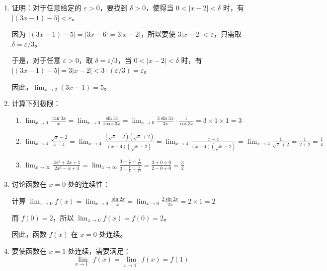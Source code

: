 \documentclass[oneside]{book}
\begin{document}
\begin{answer}
\begin{enumerate}
    \item 证明：对于任意给定的 $\varepsilon > 0$，要找到 $\delta > 0$，使得当 $0 < |x-2| < \delta$ 时，有 $|(3x-1)-5| < \varepsilon$。
    
    因为 $|(3x-1)-5| = |3x-6| = 3|x-2|$，所以要使 $3|x-2| < \varepsilon$，只需取 $\delta = \varepsilon/3$。
    
    于是，对于任意 $\varepsilon > 0$，取 $\delta = \varepsilon/3$，当 $0 < |x-2| < \delta$ 时，有 $|(3x-1)-5| = 3|x-2| < 3 \cdot (\varepsilon/3) = \varepsilon$。
    
    因此，$\displaystyle \lim_{x \to 2} (3x-1) = 5$。
    
    \item 计算下列极限：
    \begin{enumerate}
        \item $\displaystyle \lim_{x \to 0} \frac{\tan 3x}{x} = \lim_{x \to 0} \frac{\sin 3x}{x \cos 3x} = \lim_{x \to 0} \frac{3\sin 3x}{3x} \cdot \frac{1}{\cos 3x} = 3 \times 1 \times 1 = 3$
        
        \item $\displaystyle \lim_{x \to 4} \frac{\sqrt{x} - 2}{x - 4} = \lim_{x \to 4} \frac{(\sqrt{x} - 2)(\sqrt{x} + 2)}{(x-4)(\sqrt{x} + 2)} = \lim_{x \to 4} \frac{x-4}{(x-4)(\sqrt{x} + 2)} = \lim_{x \to 4} \frac{1}{\sqrt{x} + 2} = \frac{1}{2+2} = \frac{1}{4}$
        
        \item $\displaystyle \lim_{x \to \infty} \frac{3x^2 + 2x + 1}{2x^2 - x + 3} = \lim_{x \to \infty} \frac{3 + \frac{2}{x} + \frac{1}{x^2}}{2 - \frac{1}{x} + \frac{3}{x^2}} = \frac{3 + 0 + 0}{2 - 0 + 0} = \frac{3}{2}$
    \end{enumerate}
    
    \item 讨论函数在 $x=0$ 处的连续性：
    
    计算 $\displaystyle \lim_{x \to 0} f(x) = \lim_{x \to 0} \frac{\sin 2x}{x} = \lim_{x \to 0} \frac{2\sin 2x}{2x} = 2 \times 1 = 2$
    
    而 $f(0) = 2$，所以 $\displaystyle \lim_{x \to 0} f(x) = f(0) = 2$。
    
    因此，函数 $f(x)$ 在 $x=0$ 处连续。
    
    \item 要使函数在 $x=1$ 处连续，需要满足：
    \[
    \lim_{x \to 1^-} f(x) = \lim_{x \to 1^+} f(x) = f(1)
    \]
    

\end{enumerate}
\end{answer}
\end{document}
